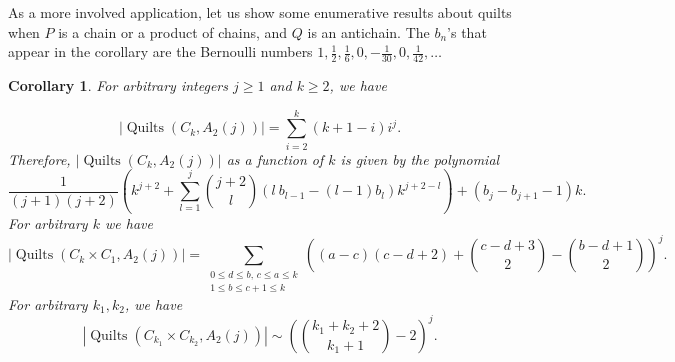 \documentclass[12pt]{amsart}
\numberwithin{equation}{section}
\newtheorem{cor}[theorem]{Corollary}
\theoremstyle{definition}
\newcommand{\quilt}{\operatorname{Quilts}}
\newcommand{\ber}{b}
\begin{document}
As a more involved application, let us show some enumerative results about quilts when $P$ is a chain or a product of chains, and $Q$ is an antichain. The $\ber_n$'s that appear in the corollary are the Bernoulli numbers $1,\frac{1}{2},\frac{1}{6},0,-\frac{1}{30},0,\frac{1}{42},\ldots$

\begin{cor} \label{prop:chainbyantichain}
 For arbitrary integers $j \geq 1$ and $k \geq 2$, we
have

\begin{equation}
 |\quilt(C_k,A_2(j))| = \sum_{i=2}^k (k+1-i)i^j.
 \end{equation}
Therefore,  $|\quilt(C_k,A_2(j))|$ as a function of $k$ is given by
the polynomial
\begin{equation}\label{eq:bernoulli}
 \frac{1}{(j+1)(j+2)} \left(k^{j+2} + \sum_{l = 1}^j \binom{j+2}l \left(l\ \ber_{l-1} - (l-1) \ber_l \right) k^{j+2-l} \right) + (\ber_j - \ber_{j+1} - 1) k.
\end{equation}
 For arbitrary $k$ we have
 $$|\quilt(C_{k} \times C_1,A_2(j))| = \sum_{\substack{0 \leq d \leq
 b,\, c \leq a \leq k \\ 1 \leq b \leq c+1 \leq k}} \left((a-c)(c-d+2)+{\textstyle \binom{c-d+3}2}-{\textstyle \binom{b-d+1}2}\right)^j.$$
 For arbitrary $k_1,k_2$, we have
 $$|\quilt(C_{k_1} \times C_{k_2},A_2(j))| \sim \left(\binom{k_1+k_2+2}{k_1+1}-2\right)^j.$$
\end{cor}
\end{document}
